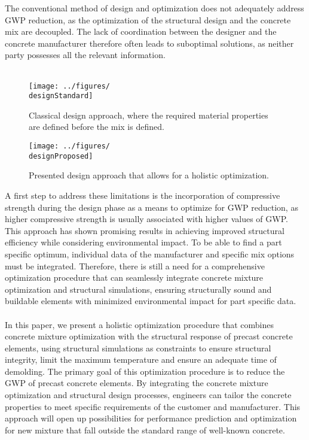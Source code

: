 The conventional method of design and optimization does not adequately address GWP reduction, as the optimization of the structural design and the concrete mix are decoupled.
The lack of coordination between the designer and the concrete manufacturer therefore often leads to suboptimal solutions, as neither party possesses all the relevant information.\\\\
%

\begin{figure}[ht]%
	\centering
	\texttt{[image: ../figures/\\designStandard]}
	\caption{Classical design approach, where the required material properties are defined before the mix is defined.}\label{fig:standard_design}
\end{figure}
\begin{figure}[ht]%
\centering
\texttt{[image: ../figures/\\designProposed]}
\caption{Presented design approach that allows for a holistic optimization.}\label{fig:proposed_workflow}
\end{figure}
A first step to address these limitations is the incorporation of compressive strength during the design phase as a means to optimize for GWP reduction, as higher compressive strength is usually associated with higher values of GWP. 
This approach has shown promising results in achieving improved structural efficiency while considering environmental impact.
To be able to find a part specific optimum, individual data of the manufacturer and specific mix options must be integrated.
Therefore, there is still a need for a comprehensive optimization procedure that can seamlessly integrate concrete mixture optimization and structural simulations, ensuring structurally sound and buildable elements with minimized environmental impact for part specific data.\\\\
%
In this paper, we present a holistic optimization procedure that combines concrete mixture optimization with the structural response of precast concrete elements, using structural simulations as constraints to ensure structural integrity, limit the maximum temperature and ensure an adequate time of demolding.
The primary goal of this optimization procedure is to reduce the GWP of precast concrete elements. 
By integrating the concrete mixture optimization and structural design processes, engineers can tailor the concrete properties to meet specific requirements of the customer and manufacturer.
This approach will open up possibilities for performance prediction and optimization for new mixture that fall outside the standard range of well-known concrete.\\\\

